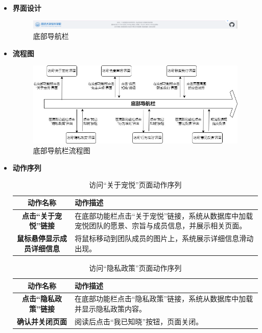 \begin{itemize}

	\item \textbf{界面设计}

	\begin{figure}[H]
		\centering
		\includegraphics[scale=0.8]{figures/FooterNavigationBar1.png} 
		\caption{底部导航栏}
	\end{figure}

	\item \textbf{流程图}

	\begin{figure}[H]
		\centering
		\includegraphics[scale=0.5]{figures/FooterNavigationBar16.jpg} 
		\caption{底部导航栏流程图}
	\end{figure}

	\item \textbf{动作序列}

	\begin{table}[H]
		\centering
		\caption{访问“关于宠悦”页面动作序列}
		\renewcommand\arraystretch{1.5}
		\begin{tabular}{|c|>{\raggedright\arraybackslash}p{10cm}|}
			\hline
			\textbf{动作名称} & \textbf{动作描述} \\ \hline
			\textbf{点击“关于宠悦”链接} & 在底部功能栏点击“关于宠悦”链接，系统从数据库中加载宠悦团队的愿景、宗旨与成员信息，并展示相关页面。 \\ \hline
			\textbf{鼠标悬停显示成员详细信息} & 将鼠标移动到团队成员的图片上，系统展示详细信息滑动出现。 \\ \hline
		\end{tabular}
	\end{table}

	\begin{table}[H]
		\centering
		\caption{访问“隐私政策”页面动作序列}
		\renewcommand\arraystretch{1.5}
		\begin{tabular}{|c|>{\raggedright\arraybackslash}p{10cm}|}
			\hline
			\textbf{动作名称} & \textbf{动作描述} \\ \hline
			\textbf{点击“隐私政策”链接} & 在底部功能栏点击“隐私政策”链接，系统从数据库中加载并显示隐私政策内容。 \\ \hline
			\textbf{确认并关闭页面} & 阅读后点击“我已知晓”按钮，页面关闭。 \\ \hline
		\end{tabular}
	\end{table}


\end{itemize}
